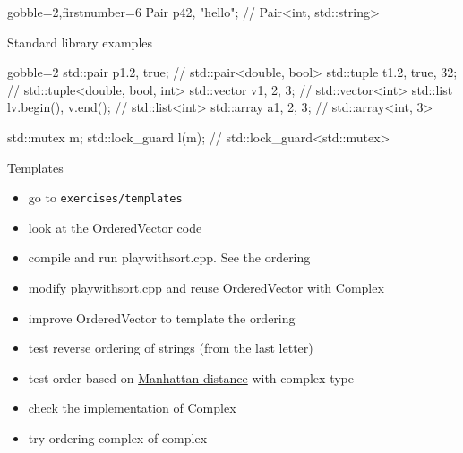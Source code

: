 \begin{advanced}
\begin{frame}[fragile]
\begin{overprint}[\columnwidth]
\begin{cppcode*}{gobble=2,firstnumber=6}
      Pair p{42, "hello"}; // Pair<int, std::string>
    \end{cppcode*}
  \end{overprint}
\end{frame}

\begin{frame}[fragile]
  \begin{block}{Standard library examples}
    \begin{cppcode*}{gobble=2}
      std::pair p{1.2, true}; // std::pair<double, bool>
      std::tuple t{1.2, true, 32};
                        // std::tuple<double, bool, int>
      std::vector v{1, 2, 3}; // std::vector<int>
      std::list l{v.begin(), v.end()}; // std::list<int>
      std::array a{1, 2, 3}; // std::array<int, 3>

      std::mutex m;
      std::lock_guard l(m); // std::lock_guard<std::mutex>
    \end{cppcode*}
  \end{block}
\end{frame}

\end{advanced}

\begin{frame}[fragile]
  \begin{exercise}{Templates}
    \begin{itemize}
    \item go to \texttt{exercises/templates}
    \item look at the OrderedVector code
    \item compile and run playwithsort.cpp. See the ordering
    \item modify playwithsort.cpp and reuse OrderedVector with Complex
    \item improve OrderedVector to template the ordering
    \item test reverse ordering of strings (from the last letter)
    \item test order based on {\color{blue} \href{https://en.wikipedia.org/wiki/Taxicab_geometry}{Manhattan distance}} with complex type
    \item check the implementation of Complex
    \item try ordering complex of complex
    \end{itemize}
  \end{exercise}
\end{frame}
